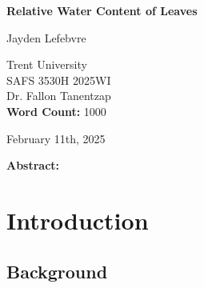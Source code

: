 \documentclass{report}
\begin{document}
\begin{titlepage}
    \begin{center}
        \vspace*{1.2cm}

        \textbf{Relative Water Content of Leaves}

        \vspace{2cm}

        Jayden Lefebvre\\

        \vspace{5cm}
        
        Trent University\\
        SAFS 3530H 2025WI\\
        Dr. Fallon Tanentzap\\
        \textbf{Word Count:} 1000

        \vfill

        February 11th, 2025
        
    \end{center}
\end{titlepage}

\clearpage

\thispagestyle{plain}
\tableofcontents

\vfill


\textbf{Abstract:} 

\clearpage


\section{Introduction}


\subsection{Background}
\end{document}
